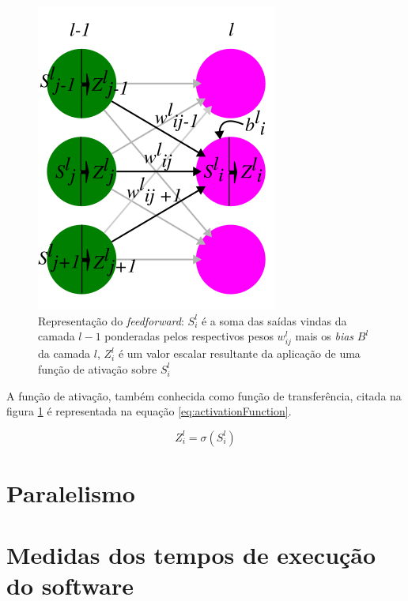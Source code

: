 \begin{apendicesenv}
	\begin{figure}[H]
		\centering
		\caption{Representação do \textit{feedforward}: $S^l_i$ é a soma das saídas vindas da camada $l-1$ ponderadas pelos respectivos pesos $ w^l_{ij}$ mais os \textit{bias} $B^l$ da camada $l$, $Z^l_i$ é um valor escalar resultante da aplicação de uma função de ativação sobre $S^l_i$}
		\label{fig:layersFeedforward}
		\includegraphics[width=0.5\linewidth]{images/layersFeedforward}
	\end{figure}

	\par A função de ativação, também conhecida como função de transferência, citada na figura \ref{fig:layersFeedforward} é representada na equação \ref{eq:activationFunction}.
	
	\begin{equation}\label{eq:activationFunction}
		Z^l_i = \sigma(S^l_i)
	\end{equation}
	
	\chapter{Paralelismo}
		\par 
		
		\chapter{Medidas dos tempos de execução do software}
		
		
\end{apendicesenv}









